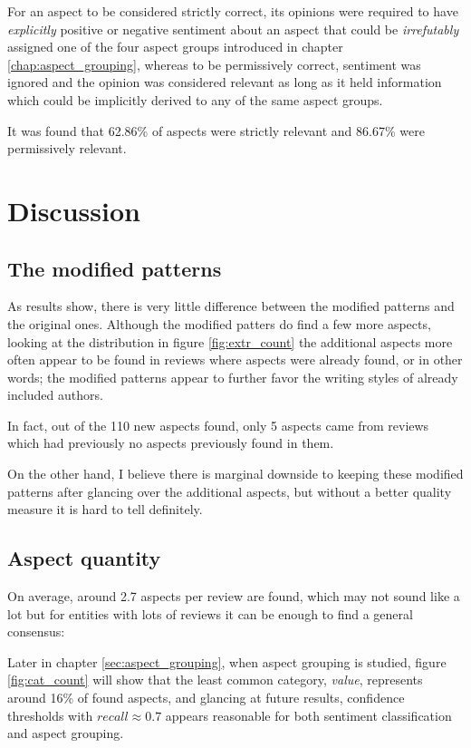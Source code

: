 \documentclass[a4paper,11pt]{kth-mag}
\begin{document}
For an aspect to be considered strictly correct, its opinions were required to have \emph{explicitly}
positive or negative sentiment about an aspect that could be \emph{irrefutably} assigned one of the
four aspect groups introduced in chapter \ref{chap:aspect_grouping},
whereas to be permissively correct, sentiment was ignored and the opinion was considered
relevant as long as it held information which could be implicitly derived to any of the same aspect groups.

It was found that 62.86\% of aspects were strictly relevant and 86.67\% were permissively relevant.


\section{Discussion}
\subsection{The modified patterns}
As results show, there is very little difference between the modified patterns and
the original ones. Although the modified patters do find a few more aspects, looking
at the distribution in figure \ref{fig:extr_count} the additional aspects more often
appear to be found in reviews where aspects were already found, or in other words;
the modified patterns appear to further favor the writing styles of already included authors.

In fact, out of the 110 new aspects found, only 5 aspects came from reviews which had previously
no aspects previously found in them.

On the other hand, I believe there is marginal downside to keeping these modified
patterns after glancing over the additional aspects, but without a better quality measure
it is hard to tell definitely.


\subsection{Aspect quantity}

On average, around 2.7 aspects per review are found, which may not sound like a lot 
but for entities with lots of reviews it can be enough to find a general consensus:

Later in chapter \ref{sec:aspect_grouping}, when aspect grouping is studied, figure \ref{fig:cat_count}
will show that the least common category, \emph{value}, represents around
16\% of found aspects, and glancing at future results, confidence thresholds with $recall\approx 0.7$
appears reasonable for both sentiment classification and aspect grouping.
\end{document}
